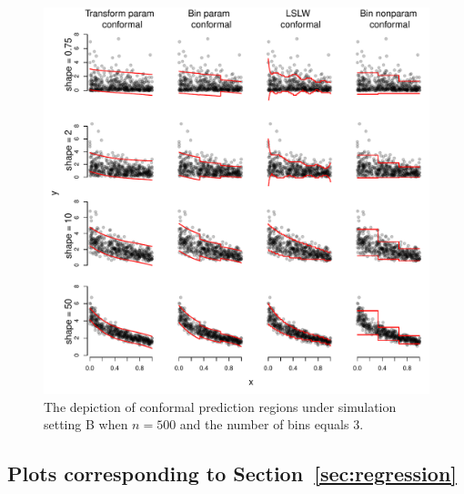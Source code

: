 \documentclass[11pt]{article}\usepackage[]{graphicx}\usepackage[]{color}
\makeatletter
\def\maxwidth{ %
  \ifdim\Gin@nat@width>\linewidth
    \linewidth
  \else
    \Gin@nat@width
  \fi
}
\newenvironment{knitrout}{}{} %
\makeatother
\begin{document}
\newpage
\begin{figure}[h!]
\begin{center}
\begin{knitrout}
\color{fgcolor}
\includegraphics[width=\maxwidth]{figure/conformal-plots-B-500-1} 

\end{knitrout}
\end{center}
\caption{The depiction of conformal prediction regions under simulation 
  setting B when $n = 500$ and the number of bins equals 3.
}
\label{conformal-plots-B-500}
\end{figure}







\newpage
\subsection{Plots corresponding to Section~\ref{sec:regression}}
\label{sec:regressionplots}
\end{document}
